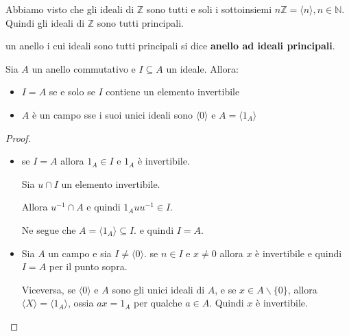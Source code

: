 \documentclass[../main.tex]{subfiles}
\begin{document}
\begin{example}
    Abbiamo visto che gli ideali di $\mathbb{Z} $ sono tutti e soli i sottoinsiemi $n \mathbb{Z}  = \langle n \rangle, n \in \mathbb{N} $.
    Quindi gli ideali di $\mathbb{Z} $ sono tutti principali.
\end{example}

\begin{definition}
    un anello i cui ideali sono tutti principali si dice \textbf{anello ad ideali principali}.
\end{definition}

\begin{proposition}
    Sia $A$ un anello commutativo e $I \subseteq A$ un ideale. Allora:
    \begin{itemize}
        \item $I = A$ se e solo se $I$ contiene un elemento invertibile
        \item $A$ è un campo sse i suoi unici ideali sono $\langle 0 \rangle$ e $A = \langle 1_A \rangle$
    \end{itemize}
\end{proposition}

\begin{proof}
    \
    \begin{itemize}
        \item se $I = A$ allora $1_A \in I$ e $1_A$ è invertibile.

              Sia $u \cap I$ un elemento invertibile.

              Allora $u^{-1} \cap A$ e quindi $1_A u u^{-1} \in I$.

              Ne segue che $A = \langle 1_A \rangle \subseteq I$. e quindi $I = A$.
        \item Sia $A$ un campo e sia $I \neq \langle 0 \rangle$. se $ n \in I$ e $x \neq 0$ allora $x$ è invertibile e quindi $I = A$
              per il punto sopra.

              Viceversa, se $\langle 0 \rangle$ e $A$ sono gli unici ideali di $A$,
              e se $x \in A  \backslash \{0\}$, allora $\langle X \rangle = \langle 1_A \rangle$, ossia $ax = 1_A$ per qualche $a \in A$. Quindi $x$ è invertibile.
    \end{itemize}
\end{proof}
\end{document}
